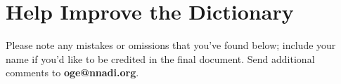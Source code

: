 \documentclass[a4paper]{article}
\begin{document}
\pagebreak

\section*{Help Improve the Dictionary}
Please note any mistakes or omissions that you've found below; include your name if you'd like to be credited in the final document. Send additional comments to \textbf{oge@nnadi.org}.

\begin{multicols}{2}

\termslot

\termslot

\termslot

\termslot

\termslot

\termslot


\end{multicols}
\end{document}
